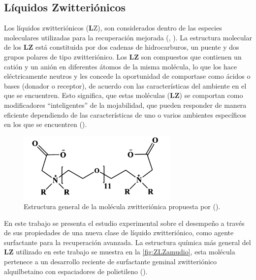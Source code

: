 \subsection{Líquidos Zwitteriónicos}

Los líquidos zwitteriónicos ({\textbf LZ}), son considerados dentro de las especies moleculares
utilizadas para la recuperación mejorada (\cite{LpezChvez2012}, \cite{altamirano2013}). La estructura molecular de los \textbf{LZ} está constituida por dos cadenas de
hidrocarburos, un puente y dos grupos polares de tipo zwitteriónico. Los \textbf{LZ} son
compuestos que contienen un catión y un anión en diferentes átomos de la misma
molécula, lo que los hace eléctricamente neutros y les concede la oportunidad de
comportase como ácidos o bases (donador o receptor), de acuerdo con las características
del ambiente en el que se encuentren. Esto significa, que estas moléculas (\textbf{LZ}) se comportan como modificadores “inteligentes” de la mojabilidad, que pueden responder de manera eficiente dependiendo de las características de uno o varios ambientes específicos en los que se encuentren (\cite{LpezChvez2012}).

\begin{figure}

\centering

\includegraphics[width=0.7\textwidth]{Graphics/ZLZamudio.png}

\caption[Molécula zwitterion propuesta]{Estructura general de la molécula zwitteriónica propuesta por (\cite{AlczarVara2015}).}

\label{fig:ZLZamudio}

\end{figure}


En este trabajo se presenta el estudio experimental sobre el desempeño a través de sus propiedades de una nueva clase de líquido zwitteriónico, como agente surfactante para la recuperación avanzada.
La estructura química más general del \textbf{LZ} utilizado en este trabajo se muestra en la \autoref{fig:ZLZamudio}, esta molécula pertenece a un desarrollo reciente de surfactante geminal zwitteriónico alquilbetaino con espaciadores de polietileno (\cite{AlczarVara2015}).


